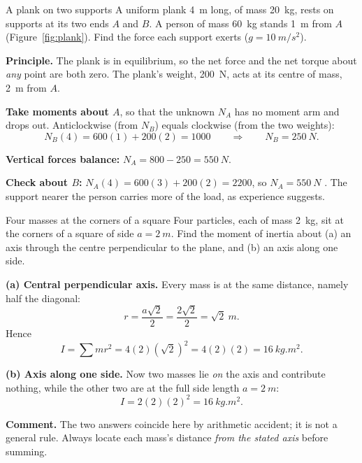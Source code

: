 \begin{exbox}{A plank on two supports}\label{ex:plank}
A uniform plank \SI{4}{m} long, of mass \SI{20}{kg}, rests on supports at its two ends $A$ and $B$. A
person of mass \SI{60}{kg} stands \SI{1}{m} from $A$ (Figure~\ref{fig:plank}). Find the force each
support exerts ($g=\SI{10}{m/s^2}$).

 \textbf{Principle.} The plank is in equilibrium, so the net force and the net torque about
\emph{any} point are both zero. The plank's weight, \SI{200}{N}, acts at its centre of mass, \SI{2}{m}
from $A$.

 \textbf{Take moments about $A$}, so that the unknown $N_A$ has no moment arm and drops out.
Anticlockwise (from $N_B$) equals clockwise (from the two weights):
\[
N_B(4)=600(1)+200(2)=1000\qquad\Longrightarrow\qquad N_B=\SI{250}{N}.
\]

 \textbf{Vertical forces balance:} $N_A=800-250=\SI{550}{N}$.

 \textbf{Check about $B$:} $N_A(4)=600(3)+200(2)=2200$, so $N_A=\SI{550}{N}$ \checkmark. The
support nearer the person carries more of the load, as experience suggests.
\end{exbox}

\begin{figure}[htbp]
\centering
{}
\end{figure}

\begin{exbox}{Four masses at the corners of a square}
Four particles, each of mass \SI{2}{kg}, sit at the corners of a square of side $a=\SI{2}{m}$. Find the
moment of inertia about (a) an axis through the centre perpendicular to the plane, and (b) an axis along
one side.

 \textbf{(a) Central perpendicular axis.} Every mass is at the same distance, namely half the
diagonal:
\[
r=\frac{a\sqrt2}{2}=\frac{2\sqrt2}{2}=\sqrt2\ \si{m}.
\]
Hence
\[
I=\sum mr^{2}=4(2)(\sqrt2)^{2}=4(2)(2)=\SI{16}{kg.m^2}.
\]

 \textbf{(b) Axis along one side.} Now two masses lie \emph{on} the axis and contribute
nothing, while the other two are at the full side length $a=\SI{2}{m}$:
\[
I=2(2)(2)^{2}=\SI{16}{kg.m^2}.
\]

 \textbf{Comment.} The two answers coincide here by arithmetic accident; it is not a general
rule. Always locate each mass's distance \emph{from the stated axis} before summing.
\end{exbox}

